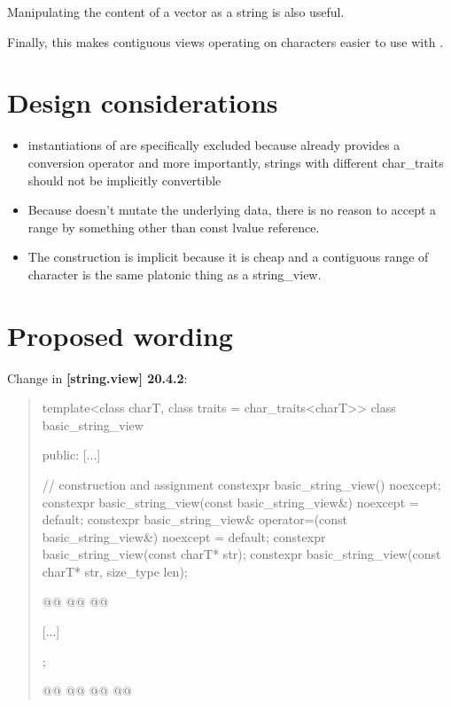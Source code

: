 \documentclass{wg21}
\begin{document}
Manipulating the content of a vector as a string is also useful.

Finally, this makes contiguous views operating on characters easier to use with .


\section{Design considerations}

\begin{itemize}
    \item instantiations of  are specifically excluded because  already provides a conversion operator and more importantly,
    strings with different char_traits should not be implicitly convertible
    \item Because  doesn't mutate the underlying data, there is no reason to accept a range by something other than const lvalue reference.
    \item The construction is implicit because it is cheap and a contiguous range of character is the same platonic thing as a string_view.
    
\end{itemize}

\section{Proposed wording}

Change in \textbf{[string.view] 20.4.2}:
\begin{quote}
\begin{codeblock}

template<class charT, class traits = char_traits<charT>>
class basic_string_view {
public:
    [...]

    // construction and assignment
    constexpr basic_string_view() noexcept;
    constexpr basic_string_view(const basic_string_view&) noexcept = default;
    constexpr basic_string_view& operator=(const basic_string_view&) noexcept = default;
    constexpr basic_string_view(const charT* str);
    constexpr basic_string_view(const charT* str, size_type len);

    @@
    @@
    @@

    [...]
};

@@
@@
@@
@@

\end{codeblock}
\end{quote}
\end{document}

